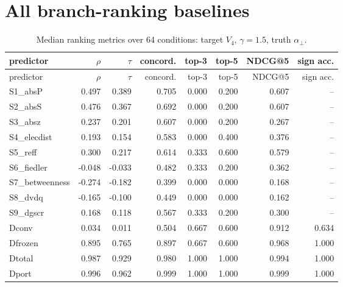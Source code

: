 \documentclass[10pt,a4paper]{article}
\newcommand{\aperp}{\alpha_{\perp}}
\begin{document}
\section{All branch-ranking baselines}
{\scriptsize
\begin{longtable}{lrrrrrrr}
\caption{Median ranking metrics over 64 conditions: target $V_4$, $\gamma=1.5$, truth $\aperp$.}\label{tab:s-bl-H4-1.5-FULL}\\
\toprule
predictor & $\rho$ & $\tau$ & concord. & top-3 & top-5 & NDCG@5 & sign acc. \\
\midrule
\endfirsthead
\toprule
predictor & $\rho$ & $\tau$ & concord. & top-3 & top-5 & NDCG@5 & sign acc. \\
\midrule
\endhead
S1\_absP & 0.497 & 0.389 & 0.705 & 0.000 & 0.200 & 0.607 & -- \\
S2\_absS & 0.476 & 0.367 & 0.692 & 0.000 & 0.200 & 0.607 & -- \\
S3\_absz & 0.237 & 0.201 & 0.607 & 0.000 & 0.200 & 0.267 & -- \\
S4\_elecdist & 0.193 & 0.154 & 0.583 & 0.000 & 0.400 & 0.376 & -- \\
S5\_reff & 0.300 & 0.217 & 0.614 & 0.333 & 0.600 & 0.579 & -- \\
S6\_fiedler & -0.048 & -0.033 & 0.482 & 0.333 & 0.200 & 0.362 & -- \\
S7\_betweenness & -0.274 & -0.182 & 0.399 & 0.000 & 0.000 & 0.168 & -- \\
S8\_dvdq & -0.165 & -0.100 & 0.449 & 0.000 & 0.000 & 0.162 & -- \\
S9\_dgscr & 0.168 & 0.118 & 0.567 & 0.333 & 0.200 & 0.300 & -- \\
Dconv & 0.034 & 0.011 & 0.504 & 0.667 & 0.600 & 0.912 & 0.634 \\
Dfrozen & 0.895 & 0.765 & 0.897 & 0.667 & 0.600 & 0.968 & 1.000 \\
Dtotal & 0.987 & 0.929 & 0.980 & 1.000 & 1.000 & 0.994 & 1.000 \\
Dport & 0.996 & 0.962 & 0.999 & 1.000 & 1.000 & 0.999 & 1.000 \\
\bottomrule
\end{longtable}}
\end{document}
